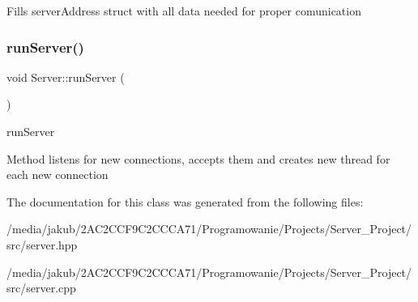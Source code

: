 Fills server\+Address struct with all data needed for proper comunication \mbox{\label{classServer_a5dfdd750d32aa4adbb4fdd8ba29b1224}} 
\subsubsection{\texorpdfstring{run\+Server()}{runServer()}}
{\footnotesize\ttfamily void Server\+::run\+Server (\begin{DoxyParamCaption}{ }\end{DoxyParamCaption})}



run\+Server 

Method listens for new connections, accepts them and creates new thread for each new connection 

The documentation for this class was generated from the following files\+:\begin{DoxyCompactItemize}
\item 
/media/jakub/2\+A\+C2\+C\+C\+F9\+C2\+C\+C\+C\+A71/\+Programowanie/\+Projects/\+Server\+\_\+\+Project/src/server.\+hpp\item 
/media/jakub/2\+A\+C2\+C\+C\+F9\+C2\+C\+C\+C\+A71/\+Programowanie/\+Projects/\+Server\+\_\+\+Project/src/server.\+cpp\end{DoxyCompactItemize}

